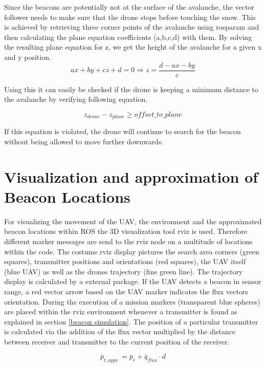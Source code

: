 \documentclass[conference]{IEEEtran}
\begin{document}
Since the beacons are potentially not at the surface of the avalanche, the vector follower needs to make sure that the drone stops before touching the snow. This is achieved by retrieving three corner points of the avalanche using rosparam and then calculating the plane equation coefficients (a,b,c,d) with them. By solving the resulting plane equation for z, we get the height of the avalanche for a given x and y position.
\begin{equation}
ax + by + cz + d = 0 \Rightarrow z = \frac{d-ax-by}{c}
\end{equation}

Using this it can easily be checked if the drone is keeping a minimum distance to the avalanche by verifying following equation.

\begin{equation}
{z}_{drone} - {z}_{plane} \geq {offset \_ to \_ plane} 
\end{equation}

If this equation is violated, the drone will continue to search for the beacon without being allowed to move further downwards.

\section{Visualization and approximation of Beacon Locations}
For visualizing the movement of the UAV, the environment and the approximated beacon locations within ROS the 3D visualization tool rviz is used. Therefore different marker messages are send to the rviz node on a multitude of locations within the code. The costume rviz display pictures the search area corners (green squares), transmitter positions and orientations (red squares), the UAV itself (blue UAV) as well as the drones trajectory (fine green line). The trajectory display is calculated by a external package. \cite{b4} If the UAV detects a beacon in sensor range, a red vector arrow based on the UAV marker indicates the flux vectors orientation.
During the execution of a mission markers (transparent blue spheres) are placed within the rviz environment whenever a transmitter is found as explained in section \ref{beacon simulation}. The position of a particular transmitter is calculated via the addition of the flux vector multiplied by the distance between receiver and transmitter to the current position of the receiver.

\begin{equation}
\bar{p}_{t, appr.}=\bar{p}_{r}+\bar{q}_{flux}\cdot d
\end{equation}
\end{document}

